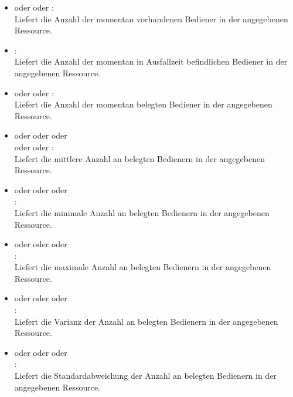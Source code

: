 \begin{itemize}

\item
{} oder  oder :\\
Liefert die Anzahl der momentan vorhandenen Bediener in der angegebenen Ressource.

\item
{}:\\
Liefert die Anzahl der momentan in Ausfallzeit befindlichen Bediener in der angegebenen Ressource.

\item
{} oder  oder :\\
Liefert die Anzahl der momentan belegten Bediener in der angegebenen Ressource.

\item
{} oder  oder  oder\\
 oder  oder :\\
Liefert die mittlere Anzahl an belegten Bedienern in der angegebenen Ressource.

\item
{} oder  oder  oder\\
:\\
Liefert die minimale Anzahl an belegten Bedienern in der angegebenen Ressource.

\item
{} oder  oder  oder\\
:\\
Liefert die maximale Anzahl an belegten Bedienern in der angegebenen Ressource.

\item
{} oder  oder  oder\\
:\\
Liefert die Varianz der Anzahl an belegten Bedienern in der angegebenen Ressource.

\item
{} oder  oder  oder\\
:\\
Liefert die Standardabweichung der Anzahl an belegten Bedienern in der angegebenen Ressource.


\end{itemize}
